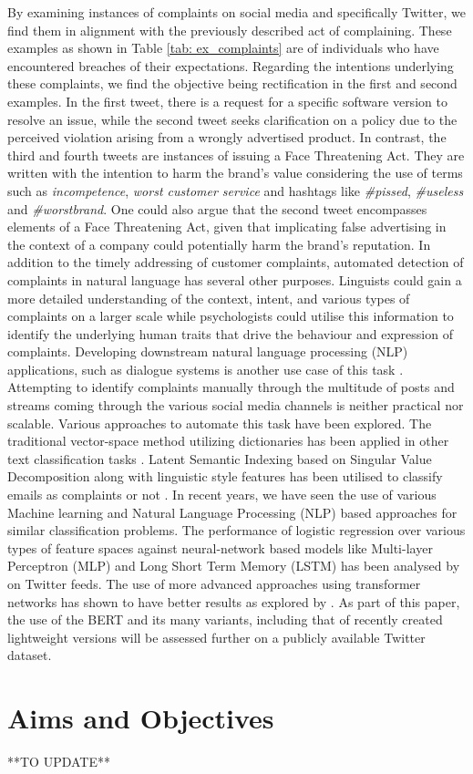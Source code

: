 By examining instances of complaints on social media and specifically Twitter, we find them in alignment with the previously described act of complaining. These examples as shown in Table \ref{tab: ex_complaints} are of individuals who have encountered breaches of their expectations. Regarding the intentions underlying these complaints, we find the objective being rectification in the first and second examples. In the first tweet, there is a request for a specific software version to resolve an issue, while the second tweet seeks clarification on a policy due to the perceived violation arising from a wrongly advertised product. In contrast, the third and fourth tweets are instances of issuing a Face Threatening Act. They are written with the intention to harm the brand's value considering the use of terms such as \textit{incompetence}, \textit{worst customer service} and hashtags like \textit{\#pissed}, \textit{\#useless} and \textit{\#worstbrand}. One could also argue that the second tweet encompasses elements of a Face Threatening Act, given that implicating false advertising in the context of a company could potentially harm the brand's reputation.
\newline \newline
In addition to the timely addressing of customer complaints, automated detection of complaints in natural language has several other purposes. Linguists could gain a more detailed understanding of the context, intent, and various types of complaints on a larger scale while psychologists could utilise this information to identify the underlying human traits that drive the behaviour and expression of complaints. Developing downstream natural language processing (NLP) applications, such as dialogue systems is another use case of this task \cite{preotiuc-pietro_automatically_2019}.
\newline \newline
Attempting to identify complaints manually through the multitude of posts and streams coming through the various social media channels is neither practical nor scalable. Various approaches to automate this task have been explored. The traditional vector-space method utilizing dictionaries has been applied in other text classification tasks \cite{liang_dictionary-based_2006}. Latent Semantic Indexing based on Singular Value Decomposition along with linguistic style features has been utilised to classify emails as complaints or not \cite{coussement_improving_2008}. In recent years, we have seen the use of various Machine learning and Natural Language Processing (NLP) based approaches for similar classification problems. The performance of logistic regression over various types of feature spaces against neural-network based models like Multi-layer Perceptron (MLP) and Long Short Term Memory (LSTM) has been analysed by \cite{preotiuc-pietro_automatically_2019} on Twitter feeds. The use of more advanced approaches using transformer networks has shown to have better results as explored by \cite{jin_complaint_2020}. As part of this paper, the use of the BERT and its many variants, including that of recently created lightweight versions will be assessed further on a publicly available Twitter dataset.

\section{Aims and Objectives}

**TO UPDATE**

